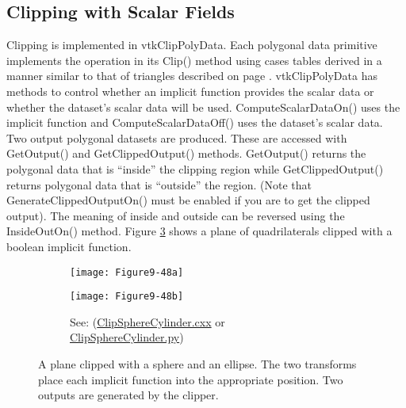 \subsection{Clipping with Scalar Fields}

Clipping is implemented in vtkClipPolyData. Each polygonal data primitive implements the operation in its Clip() method using cases tables derived in a manner similar to that of triangles described on page \pageref{subsec:clipping_with_scalar_fields}. vtkClipPolyData has methods to control whether an implicit function provides the scalar data or whether the dataset's scalar data will be used. ComputeScalarDataOn() uses the implicit function and ComputeScalarDataOff() uses the dataset's scalar data. Two output polygonal datasets are produced. These are accessed with GetOutput() and GetClippedOutput() methods. GetOutput() returns the polygonal data that is ``inside'' the clipping region while GetClippedOutput() returns polygonal data that is ``outside'' the region. (Note that GenerateClippedOutputOn() must be enabled if you are to get the clipped output). The meaning of inside and outside can be reversed using the InsideOutOn() method. Figure \ref{fig:Figure9-48} shows a plane of quadrilaterals clipped with a boolean implicit function.

\begin{figure}[htb]
    \centering
	\begin{subfigure}[h]{0.96\linewidth}
		\texttt{[image: Figure9-48a]}
		\captionsetup{justification=centering}
		\caption*{}
		\label{fig:Figure9-48a}
	\end{subfigure}
	\hfill
	\begin{subfigure}[h]{0.48\linewidth}
		\texttt{[image: Figure9-48b]}
		\captionsetup{justification=centering}
		\caption*{See: (\href{https://lorensen.github.io/VTKExamples/site/Cxx/VisualizationAlgorithms/ClipSphereCylinder/}{ClipSphereCylinder.cxx} or \href{https://lorensen.github.io/VTKExamples/site/Python/VisualizationAlgorithms/ClipSphereCylinder/}{ClipSphereCylinder.py})}
		\label{fig:Figure9-48b}
	\end{subfigure}
	\caption{A plane clipped with a sphere and an ellipse. The two transforms place each implicit function into the appropriate position. Two outputs are generated by the clipper.}\label{fig:Figure9-48}
\end{figure}

